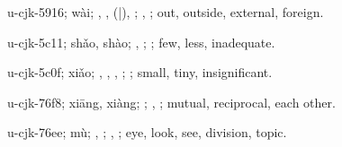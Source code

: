 \begin{multicols}{2}
{\cjkgGlue{}u-cjk-5916; wài; \cjkgGlue{}, \cjkgGlue{}, \cjkgGlue{}\cjkgGlue{}(\cjkgGlue{}|\cjkgGlue{}), \cjkgGlue{}; \cjkgGlue{}, \cjkgGlue{}; out, outside, external, foreign.

\cjkgGlue{}u-cjk-5c11; shǎo, shào; \cjkgGlue{}\cjkgGlue{}\cjkgGlue{}, \cjkgGlue{}\cjkgGlue{}\cjkgGlue{}; \cjkgGlue{}; few, less, inadequate.

\cjkgGlue{}u-cjk-5c0f; xiǎo; \cjkgGlue{}\cjkgGlue{}\cjkgGlue{}, \cjkgGlue{}, \cjkgGlue{}, \cjkgGlue{}; \cjkgGlue{}; small, tiny, insignificant.

\cjkgGlue{}u-cjk-76f8; xiāng, xiàng; \cjkgGlue{}; \cjkgGlue{}, \cjkgGlue{}; mutual, reciprocal, each other.

\cjkgGlue{}u-cjk-76ee; mù; \cjkgGlue{}, \cjkgGlue{}; \cjkgGlue{}, \cjkgGlue{}; eye, look, see, division, topic.

}
\end{multicols}
